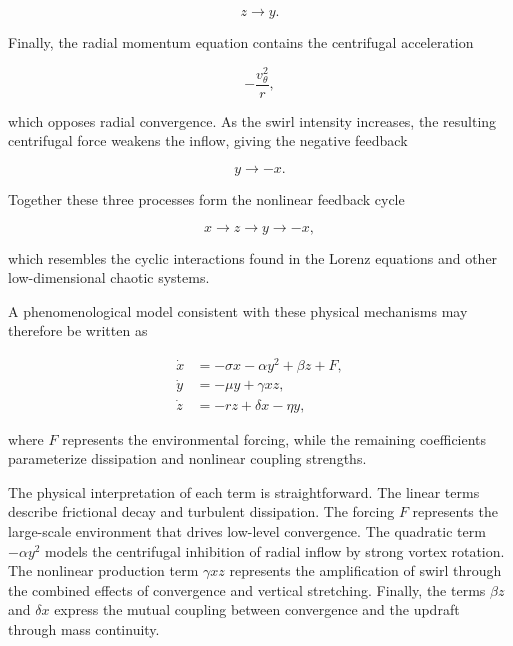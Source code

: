 \begin{equation}
z \longrightarrow y.
\end{equation}

Finally, the radial momentum equation contains the centrifugal acceleration

\begin{equation}
-\frac{v_\theta^2}{r},
\end{equation}

which opposes radial convergence. As the swirl intensity increases, the resulting centrifugal force weakens the inflow, giving the negative feedback

\begin{equation}
y \longrightarrow -x.
\end{equation}

Together these three processes form the nonlinear feedback cycle

\begin{equation}
x
\rightarrow
z
\rightarrow
y
\rightarrow
-x,
\end{equation}

which resembles the cyclic interactions found in the Lorenz equations and other low-dimensional chaotic systems.

A phenomenological model consistent with these physical mechanisms may therefore be written as

\begin{subequations}
\begin{align}
\dot{x}
&=
-\sigma x
-\alpha y^2
+\beta z
+F,
\\
\dot{y}
&=
-\mu y
+\gamma xz,
\\
\dot{z}
&=
-r z
+\delta x
-\eta y,
\end{align}
\end{subequations}

where $F$ represents the environmental forcing, while the remaining coefficients parameterize dissipation and nonlinear coupling strengths.

The physical interpretation of each term is straightforward. The linear terms describe frictional decay and turbulent dissipation. The forcing $F$ represents the large-scale environment that drives low-level convergence. The quadratic term $-\alpha y^2$ models the centrifugal inhibition of radial inflow by strong vortex rotation. The nonlinear production term $\gamma xz$ represents the amplification of swirl through the combined effects of convergence and vertical stretching. Finally, the terms $\beta z$ and $\delta x$ express the mutual coupling between convergence and the updraft through mass continuity.

